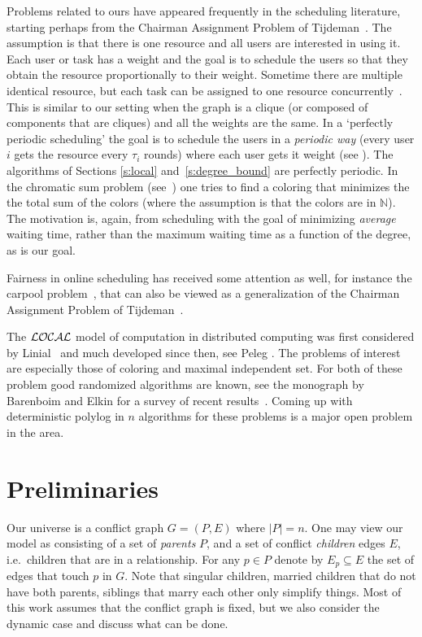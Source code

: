 \documentclass[11pt]{article}
\begin{document}
Problems related to ours have appeared frequently in the scheduling literature, starting perhaps from the Chairman Assignment Problem of Tijdeman~\cite{Tijdeman1980}. The assumption is that there is one resource and all users are interested in using it. Each user or task has a weight and the goal is to schedule the users so that they obtain the resource proportionally to their weight.  Sometime there are multiple identical resource, but each task can be assigned to one resource concurrently~\cite{BaruahCPV93,LitmanMS11}. This is similar to our setting when the graph is a clique (or composed of components that are cliques) and all the weights are the same.
In a `perfectly periodic scheduling' the goal is to schedule the users in a {\em periodic way} (every user $i$ gets the resource every $\tau_i$ rounds)  where each user gets it weight (see \cite{Bar-NoyNP02}). The algorithms of Sections \ref{s:local} and~\ref{s:degree_bound} are perfectly periodic.
In the chromatic sum problem (see~\cite{Bar-NoyBHST98}) one tries to find a coloring that minimizes the the total sum of the colors (where the assumption is that the colors are in $\mathbb{N}$). The motivation is, again, from scheduling with the goal of minimizing {\em average} waiting time, rather than the maximum waiting time as a function of the degree, as is our goal.

Fairness in online scheduling has received some attention as well, for instance the carpool problem~\cite{FaginW83,AjtaiANRSW98,Naor2005}, that can also be viewed as a generalization of the Chairman Assignment Problem of Tijdeman~\cite{Tijdeman1980}.

The ${\cal LOCAL}$ model of computation in distributed computing was first considered by Linial~\cite{Linial92} and much developed since then, see  Peleg \cite{Peleg00}. The problems of interest  are especially those of coloring and maximal independent set. For both of these problem good randomized algorithms are known, see the monograph by Barenboim and Elkin for a survey of recent results~\cite{BarenboimE13}. Coming up with deterministic polylog in $n$ algorithms for these problems is a major open problem in the area.


\section{Preliminaries}\label{s:p}



Our universe is a conflict graph $G=(P, E)$ where $|P|=n$. One may view our model as consisting of a set of {\em
parents} $P$, and a set of conflict {\em children} edges $E$, i.e.\ children that are in a relationship.
For any $p\in P$ denote by $E_p\subseteq E$ the set of edges that touch $p$ in $G$.
Note that singular children,  married children that do not have both parents, siblings that marry each other  only simplify things.
Most of this work assumes that the conflict graph is fixed, but we also consider the dynamic case and discuss what can be done.
\end{document}
